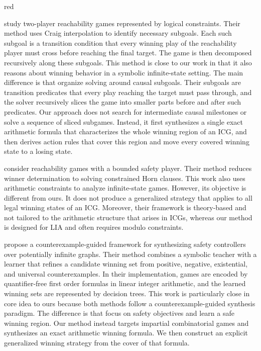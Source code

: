 \documentclass[review]{elsarticle}
\begin{document}
\begin{color}{red}

\citet{BaiCF2021} study two-player reachability games represented by logical constraints.
Their method uses Craig interpolation to identify necessary subgoals.
Each such subgoal is a transition condition that every winning play of the reachability player must cross before reaching the final target.
The game is then decomposed recursively along these subgoals.
This method is close to our work in that it also reasons about winning behavior in a symbolic infinite-state setting.
The main difference is that \citet{BaiCF2021} organize solving around causal subgoals.
Their subgoals are transition predicates that every play reaching the target must pass through, and the solver recursively slices the game into smaller parts before and after such predicates.
Our approach does not search for intermediate causal milestones or solve a sequence of sliced subgames.
Instead, it first synthesizes a single exact arithmetic formula that characterizes the whole winning region of an ICG, and then derives action rules that cover this region and move every covered winning state to a losing state.

\citet{FaeP2023} consider reachability games with a bounded safety player.
Their method reduces winner determination to solving constrained Horn clauses.
This work also uses arithmetic constraints to analyze infinite-state games.
However, its objective is different from ours.
It does not produce a generalized strategy that applies to all legal winning states of an ICG.
Moreover, their framework is theory-based and not tailored to the arithmetic structure that arises in ICGs, whereas our method is designed for LIA and often requires modulo constraints.

\citet{DanO2019} propose a counterexample-guided framework for synthesizing safety controllers over potentially infinite graphs.
Their method combines a symbolic teacher with a learner that refines a candidate winning set from positive, negative, existential, and universal counterexamples.
In their implementation, games are encoded by quantifier-free first order formulas in linear integer arithmetic, and the learned winning sets are represented by decision trees.
This work is particularly close in core idea to ours because both methods follow a counterexample-guided synthesis paradigm.
The difference is that \citet{DanO2019} focus on safety objectives and learn a safe winning region.
Our method instead targets impartial combinatorial games and synthesizes an exact arithmetic winning formula.
We then construct an explicit generalized winning strategy from the cover of that formula.


\end{color}
\end{document}
